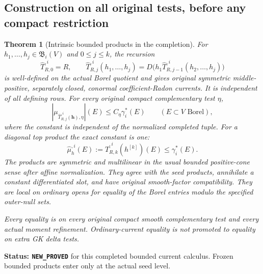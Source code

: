 \documentclass[11pt,a4paper]{article}
\numberwithin{equation}{section}
\newtheorem{theorem}{Theorem}[section]
\theoremstyle{definition}
\theoremstyle{remark}
\begin{document}
\subsection{Construction on all original tests, before any compact restriction}

\begin{theorem}[Intrinsic bounded products in the completion]
\label{thm:r12-completed-band-products}
For $h_1,\ldots,h_j\in\mathfrak B_i(V)$ and $0\leq j\leq k$,
the recursion
\[
 \widehat T^{,i}_{R,0}=R,\qquad
 \widehat T^{,i}_{R,j}(h_1,\ldots,h_j)
    =D\bigl(h_1\widehat T^{,i}_{R,j-1}(h_2,\ldots,h_j)\bigr)
 \tag{BC4}
\]
is well-defined on the actual Borel quotient and gives original
symmetric middle-positive, separately closed, conormal
coefficient-Radon currents. It is independent of all defining
rows. For every original compact complementary test $\eta$,
\[
 \left|\mu_{\widehat T^{,i}_{R,j}(\mathbf h),\eta}\right|(E)
                \leq C_\eta\gamma_i^*(E)
                         \qquad(E\subset V\text{ Borel}),
 \tag{BC5}
\]
where the constant is independent of the normalized completed
tuple. For a diagonal top product the exact constant is one:
\[
       \widehat\mu^{,i}_h(E)
           :=\widehat T^{,i}_{R,k}(h^{[k]})(E)
                          \leq\gamma_i^*(E).
 \tag{BC6}
\]
The products are symmetric and multilinear in the usual bounded
positive-cone sense after affine normalization. They agree with
the seed products, annihilate a constant differentiated slot,
and have original smooth-factor compatibility. They are local
on ordinary opens for equality of the Borel entries modulo the
specified outer-null sets.

Every equality is on every original compact smooth complementary
test and every actual moment refinement. Ordinary-current
equality is not promoted to equality on extra GK delta tests.
\end{theorem}

\noindent\textbf{Status: \texttt{NEW\_PROVED}} for this completed
bounded current calculus. Frozen bounded products enter only at
the actual seed level.
\end{document}
